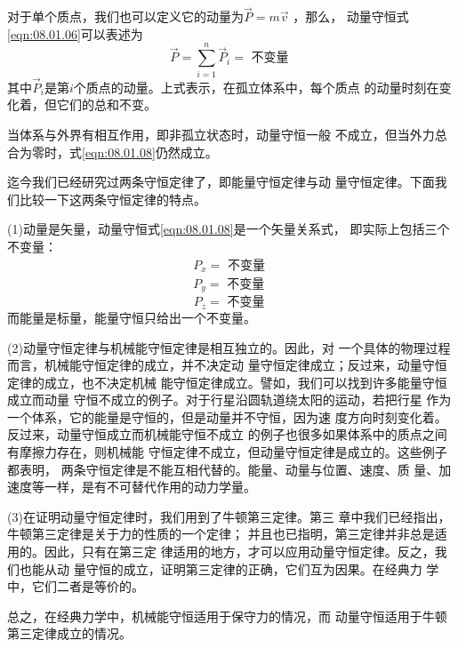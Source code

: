 对于单个质点，我们也可以定义它的动量为$ \vec { P } = m \vec { v } $ ，那么，
动量守恒\lhbrak 式\eqref{eqn:08.01.06}\rhbrak 可以表述为
\begin{equation}\label{eqn:08.01.08}
  \vec { P } = \sum _ { i = 1 } ^ { n } \vec { P } _ { i } = \text { 不变量 }
\end{equation}
其中$ \vec { P } _ { i } $是第$ i $个质点的动量。上式表示，在孤立体系中，每个质点
的动量时刻在变化着，但它们的总和不变。

当体系与外界有相互作用，即非孤立状态时，动量守恒一般
不成立，但当外力总合为零时，式\eqref{eqn:08.01.08}仍然成立。

迄今我们已经研究过两条守恒定律了，即能量守恒定律与动
量守恒定律。下面我们比较一下这两条守恒定律的特点。

(1)动量是矢量，动量守恒\lhbrak 式\eqref{eqn:08.01.08}\rhbrak 是一个矢量关系式，
即实际上包括三个不变量：
\begin{equation*}
  \begin{aligned}
    P _ { x } = \text { 不变量 } \\
    P _ { y } = \text { 不变量 }
  \end{aligned}
\end{equation*}
\begin{equation}\label{eqn:08.01.09}
  P _ { z } = \text { 不变量 }
\end{equation}
而能量是标量，能量守恒只给出一个不变量。

(2)动量守恒定律与机械能守恒定律是相互独立的。因此，对
一个具体的物理过程而言，机械能守恒定律的成立，并不决定动
量守恒定律成立；反过来，动量守恒定律的成立，也不决定机械
能守恒定律成立。譬如，我们可以找到许多能量守恒成立而动量
守恒不成立的例子。对于行星沿圆轨道绕太阳的运动，若把行星
作为一个体系，它的能量是守恒的，但是动量并不守恒，因为速
度方向时刻变化着。反过来，动量守恒成立而机械能守恒不成立
的例子也很多如果体系中的质点之间有摩擦力存在，则机械能
守恒定律不成立，但动量守恒定律是成立的。这些例子都表明，
两条守恒定律是不能互相代替的。能量、动量与位置、速度、质
量、加速度等一样，是有不可替代作用的动力学量。

(3)在证明动量守恒定律时，我们用到了牛顿第三定律。第三
章中我们已经指出，牛顿第三定律是关于力的性质的一个定律；
并且也已指明，第三定律并非总是适用的。因此，只有在第三定
律适用的地方，才可以应用动量守恒定律。反之，我们也能从动
量守恒的成立，证明第三定律的正确，它们互为因果。在经典力
学中，它们二者是等价的。

总之，在经典力学中，机械能守恒适用于保守力的情况，而
动量守恒适用于牛顿第三定律成立的情况。

